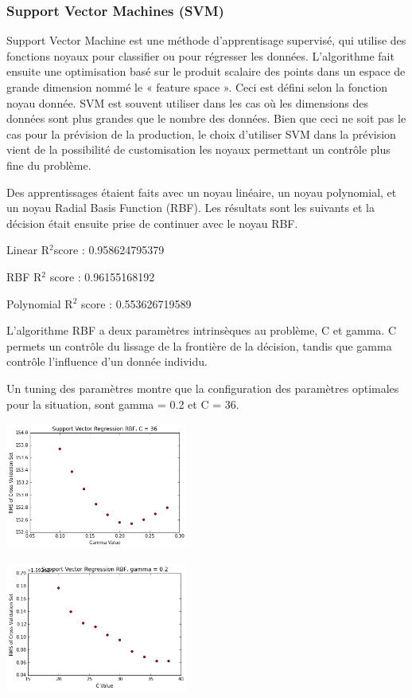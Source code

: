 \documentclass[a4paper]{article}
\begin{document}
\begin{multicols}{2}
\subsubsection{Support Vector Machines (SVM)}

Support Vector Machine  est une méthode d’apprentisage supervisé, qui utilise des fonctions noyaux pour classifier ou pour régresser les données. L’algorithme fait ensuite une optimisation basé sur le produit scalaire des points dans un espace de grande dimension nommé le « feature space ». Ceci est défini selon la fonction noyau donnée. SVM est souvent utiliser dans les cas où les dimensions des données sont plus grandes que le nombre des données. Bien que ceci ne soit pas le cas pour la prévision de la production, le choix d’utiliser SVM dans la prévision vient de la possibilité de customisation les noyaux permettant un contrôle plus fine du problème. 

Des apprentissages étaient faits avec un noyau linéaire, un noyau polynomial, et un noyau Radial Basis Function (RBF). Les résultats sont les suivants et la décision était ensuite prise de continuer avec le noyau RBF. 

Linear R$^{2} $score : 0.958624795379

RBF R$^{2}$ score : 0.96155168192

Polynomial R$^{2}$ score : 0.553626719589

L'algorithme RBF a deux paramètres intrinsèques au problème, C et gamma. C permets un contrôle du lissage de la frontière de la décision, tandis que gamma contrôle l’influence d’un donnée individu. 

Un tuning des paramètres montre que la configuration des paramètres optimales pour la situation, sont gamma = 0.2 et C = 36.


\includegraphics[width=0.45\textwidth]{./images/svmselectgamma.png}

\includegraphics[width=0.45\textwidth]{./images/svmselectc.png}


\end{multicols}
\end{document}

